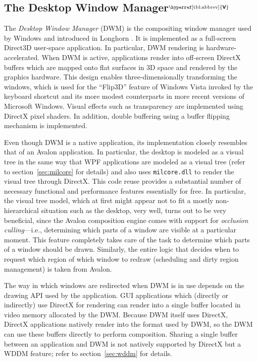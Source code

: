 \documentclass[10pt,twocolumn,a4paper,os=win]{article}
\newcommand{\bs}[1]{\textbf{\sffamily #1}}
\newcommand{\winver}[1]{$^{\text{\hyperref[tbl:abbrev]{\bs{#1}}}}$}
\begin{document}
		\subsection{The Desktop Window Manager\winver{V}}\label{sec:dwm}
			The \emph{Desktop Window Manager} (DWM) is the compositing window
			manager used by Windows and introduced in Longhorn
			\cite{dwmoverview}.  It is implemented as a full-screen Direct3D
			user-space application. In particular, DWM rendering is
			hardware-accelerated. When DWM is active, applications render into
			off-screen DirectX buffers which are mapped onto flat surfaces in
			3D space and rendered by the graphics hardware. This design enables
			three-dimensionally transforming the windows, which is used for the
			\enquote{Flip3D} feature of Windows Vista invoked by the keyboard
			shortcut  and its more modest counterparts in more
			recent versions of Microsoft Windows. Visual effects such as
			transparency are implemented using DirectX pixel shaders. In addition,
			double buffering using a buffer flipping mechanism is implemented.
			\cite{dwmdirectx}

			Even though DWM is a native application, its implementation closely
			resembles that of an Avalon application. In particular, the desktop
			is modeled as a visual tree in the same way that WPF applications
			are modeled as a visual tree (refer to section~\ref{sec:milcore}
			for details) and also uses \texttt{milcore.dll} to render the
			visual tree through DirectX. This code reuse provides a
			substantial number of necessary functional and performance
			features essentially for free.  In particular, the visual tree
			model, which at first might appear not to fit a mostly
			non-hierarchical situation such as the desktop, very well,
			turns out to be very beneficial, since the Avalon composition
			engine comes with support for \emph{occlusion culling}---i.e.,
			determining which parts of a window are visible at a particular
			moment. This feature completely takes care of the task to
			determine which parts of a window should be drawn. Similarly, the
			entire logic that decides when to request which region of which window
			to redraw (scheduling and dirty region management) is taken from
			Avalon.
			\cite{dwmwpf}

			The way in which windows are redirected when DWM is in use depends
			on the drawing API used by the application. GUI applications which
			(directly or indirectly)
			use DirectX for rendering can render into a single buffer located
			in video memory allocated
			by the DWM. Because DWM itself uses DirectX, DirectX applications
			natively render into the format used by DWM, so the DWM can use
			these buffers directly to perform composition. Sharing a single buffer
			between an application and DWM is not natively supported by DirectX
			but a WDDM feature; refer to section~\ref{sec:wddm} for details.
			\cite{dwmredirect}
\end{document}
